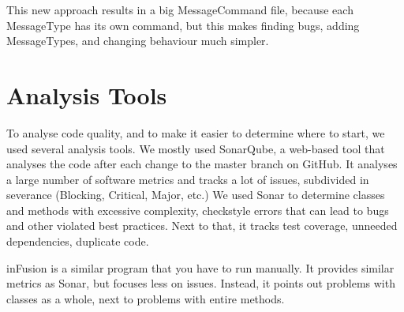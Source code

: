 This new approach results in a big MessageCommand file, because each MessageType has its own command, but this makes finding bugs, adding MessageTypes, and changing behaviour much simpler.

\section{Analysis Tools}
To analyse code quality, and to make it easier to determine where to start, we used several analysis tools. We mostly used SonarQube, a web-based tool that analyses the code after each change to the master branch on GitHub. It analyses a large number of software metrics and tracks a lot of issues, subdivided in severance (Blocking, Critical, Major, etc.) We used Sonar to determine classes and methods with excessive complexity, checkstyle errors that can lead to bugs and other violated best practices. Next to that, it tracks test coverage, unneeded dependencies, duplicate code.

inFusion is a similar program that you have to run manually. It provides similar metrics as Sonar, but focuses less on issues. Instead, it points out problems with classes as a whole, next to problems with entire methods. 